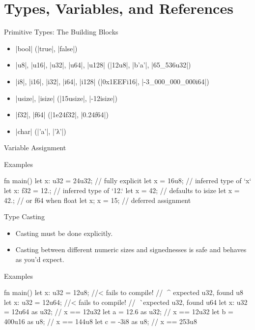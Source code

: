 \documentclass[8pt, aspectratio=169]{beamer}
\begin{document}
\section{Types, Variables, and References}

\begin{frame}{Primitive Types: The Building Blocks}
\begin{itemize}
\item \rustinline|bool| (\rustinline|true|, \rustinline|false|)
\item \rustinline|u8|, \rustinline|u16|, \rustinline|u32|, \rustinline|u64|, \rustinline|u128| (\rustinline|12u8|, \rustinline|b'a'|, \rustinline|65_536u32|)
\item \rustinline|i8|, \rustinline|i16|, \rustinline|i32|, \rustinline|i64|, \rustinline|i128| (\rustinline|0x1EEFi16|, \rustinline|-3_000_000_000i64|)
\item \rustinline|usize|, \rustinline|isize| (\rustinline|15usize|, \rustinline|-12isize|)
\item \rustinline|f32|, \rustinline|f64| (\rustinline|1e24f32|, \rustinline|0.24f64|)
\item \rustinline|char| (\rustinline|'a'|, \rustinline|'λ'|)
\end{itemize}
\end{frame}

\begin{frame}[fragile]{Variable Assignment}
\begin{exampleblock}{Examples}
\begin{rustcode}
fn main() {
    let x: u32 = 24u32; // fully explicit
    let x = 16u8;       // inferred type of `x`
    let x: f32 = 12.;   // inferred type of `12.`
    let x = 42;         // defaults to isize
    let x = 42.;        // or f64 when float
    let x;
    x = 15;             // deferred assignment
}
\end{rustcode}
\end{exampleblock}
\end{frame}

\begin{frame}[fragile]{Type Casting}
\begin{itemize}
\item Casting must be done \alert{explicitly}.
\item Casting between different numeric sizes and signednesses is safe and behaves as you'd expect.
\end{itemize}
\begin{exampleblock}{Examples}
\begin{rustcode}
fn main() {
    let x: u32 = 12u8;          //< fails to compile!
    //           ^^^^ expected u32, found u8
    let x: u32 = 12u64;         //< fails to compile!
    //           ^^^^^ expected u32, found u64
    let x: u32 = 12u64 as u32;  // x == 12u32
    let a = 12.6 as u32;        // x == 12u32
    let b = 400u16 as u8;       // x == 144u8
    let c = -3i8 as u8;         // x == 253u8
}
\end{rustcode}
\end{exampleblock}
\end{frame}
\end{document}

